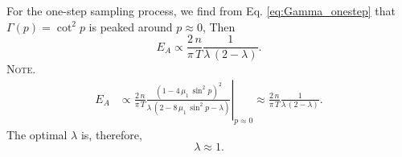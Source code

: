 \documentclass[reprint, floatfix]{revtex4-1}
\newcommand{\note}[1]{{\color{DarkGreen}\footnotesize \textsc{Note.} #1}}
\newcommand{\Err}{E}
\begin{document}
For the one-step sampling process,
we find from Eq. \eqref{eq:Gamma_onestep}
that $\Gamma(p) = \cot^2 p$
is peaked around $p \approx 0$,
%
Then
$$
  \Err_A
  \propto
  \frac{   2 \, n }
       { \pi \, T }
  \frac{             1             }
       {  \lambda \, (2 - \lambda) }
  .
$$
\note{
$$
\begin{aligned}
  \Err_A
  &
  \propto
  \frac{   2 \, n }
       { \pi \, T }
  \left.
  \frac{            \left(1 - 4 \, \mu_1 \, \sin^2 p \right)^2         }
       { \lambda \, \left(2 - 8 \, \mu_1 \, \sin^2 p - \lambda \right) }
  \right|_{ p \approx 0 }
  \approx
  \frac{   2 \, n }
       { \pi \, T }
  \frac{             1             }
       {  \lambda \, (2 - \lambda) }
  .
\end{aligned}
$$
}%
%
The optimal $\lambda$ is, therefore,
%
\begin{equation}
\lambda \approx 1.
\label{eq:lambda_nn_onestep}
\end{equation}
%
\end{document}

